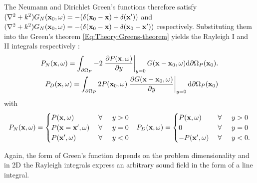 The Neumann and Dirichlet Green's functions therefore satisfy $(\nabla^2+k^2)G_N(\mathbf{x}_0,\omega) = -(\delta(\mathbf{x}_0-\mathbf{x}) + \delta(\mathbf{x}'))$ and $(\nabla^2+k^2)G_N(\mathbf{x}_0,\omega) = -(\delta(\mathbf{x}_0-\mathbf{x})  - \delta(\mathbf{x}_0-\mathbf{x}'))$ respectively. Substituting them into the Green's theorem \eqref{Eq:Theory:Greens-theorem} yields the Rayleigh I and II integrals respectively \cite{Berkhout1984}:
\begin{eqnarray}
P_N(\mathbf{x},\omega) =
\int_{\partial \Omega_P}
-2
\left. \frac{\partial P(\mathbf{x},\omega)}{\partial y} \right|_{y = 0} 
G(\mathbf{x}-\mathbf{x}_0,\omega) \mathrm{d} \partial \Omega_P ( \mathbf{x}_0).
\\
P_D(\mathbf{x},\omega) =
\int_{\partial \Omega_P}
2 P(\mathbf{x}_0,\omega)  
\left. \frac{\partial G(\mathbf{x}-\mathbf{x}_0,\omega)}{\partial y} \right|_{y = 0} 
\mathrm{d} \partial \Omega_P ( \mathbf{x}_0)
\label{Eq:Theory:RayleighI_II}
\end{eqnarray}
with
\begin{align*}
P_N(\mathbf{x},\omega) = \begin{cases} 
P(\mathbf{x},\omega)           & \hspace{1mm} \forall \hspace{5mm}  y>0  	     \\
P(\mathbf{x} = \mathbf{x}',\omega) 			& \hspace{1mm} \forall \hspace{5mm}  y=0  \\
P(\mathbf{x}',\omega) 			& \hspace{1mm} \forall \hspace{5mm}  y<0
\end{cases}
&&
P_D(\mathbf{x},\omega) = \begin{cases} 
P(\mathbf{x},\omega)           & \hspace{1mm} \forall \hspace{5mm}  y>0  	     \\
0 			& \hspace{1mm} \forall \hspace{5mm}  y=0  \\
-P(\mathbf{x}',\omega) 			& \hspace{1mm} \forall \hspace{5mm}  y<0.
\end{cases}
\end{align*}

Again, the form of Green's function depends on the problem dimensionality and in 2D the Rayleigh integrals express an arbitrary sound field in the form of a line integral.

